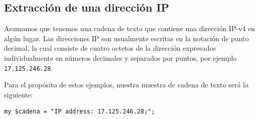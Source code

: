 \subsection{Extracción de una dirección IP}

Asumamos que tenemos una cadena de texto que contiene
una dirección IP-v4 en algún lugar. Las direcciones IP
son usualmente escritas en la notación de punto decimal,
la cual consiste de cuatro octetos de la dirección expresados
individualmente en números decimales y separados por puntos,
por ejemplo {\tt 17.125.246.28}.

Para el propósito de estos ejemplos, nuestra muestra de
cadena de texto será la siguiente:

\begin{verbatim}
my $cadena = "IP address: 17.125.246.28;";
\end{verbatim}
%

